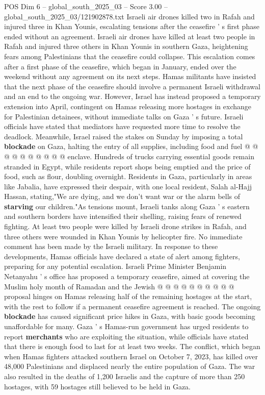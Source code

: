 \begin{textsample}{POS Dim 6 – global\_south\_2025\_03 – Score 3.00 – global\_south\_2025\_03/121902878.txt}  \label{ex:f6_pos_226}
Israeli air drones killed two in Rafah and injured three in Khan Younis, escalating tensions after the ceasefire ' s first phase ended without an agreement.
Israeli air drones have killed at least two people in Rafah and injured three others in Khan Younis in southern Gaza, heightening fears among Palestinians that the ceasefire could collapse.
This escalation comes after a first phase of the ceasefire, which began in January, ended over the weekend without any agreement on its next steps.
Hamas militants have insisted that the next phase of the ceasefire should involve a permanent Israeli withdrawal and an end to the ongoing war.
However, Israel has instead proposed a temporary extension into April, contingent on Hamas releasing more hostages in exchange for Palestinian detainees, without immediate talks on Gaza ' s future.
Israeli officials have stated that mediators have requested more time to resolve the deadlock.
Meanwhile, Israel raised the stakes on Sunday by imposing a total \textbf{blockade} on Gaza, halting the entry of all supplies, including food and fuel @ @ @ @ @ @ @ @ @ @ enclave.
Hundreds of trucks carrying essential goods remain stranded in Egypt, while residents report shops being emptied and the price of food, such as flour, doubling overnight.
Residents in Gaza, particularly in areas like Jabalia, have expressed their despair, with one local resident, Salah al-Hajj Hassan, stating,"We are dying, and we don't want war or the alarm bells of \textbf{starving} our children."As tensions mount, Israeli tanks along Gaza ' s eastern and southern borders have intensified their shelling, raising fears of renewed fighting.
At least two people were killed by Israeli drone strikes in Rafah, and three others were wounded in Khan Younis by helicopter fire.
No immediate comment has been made by the Israeli military.
In response to these developments, Hamas officials have declared a state of alert among fighters, preparing for any potential escalation.
Israeli Prime Minister Benjamin Netanyahu ' s office has proposed a temporary ceasefire, aimed at covering the Muslim holy month of Ramadan and the Jewish @ @ @ @ @ @ @ @ @ @ proposal hinges on Hamas releasing half of the remaining hostages at the start, with the rest to follow if a permanent ceasefire agreement is reached.
The ongoing \textbf{blockade} has caused significant price hikes in Gaza, with basic goods becoming unaffordable for many.
Gaza ' s Hamas-run government has urged residents to report \textbf{merchants} who are exploiting the situation, while officials have stated that there is enough food to last for at least two weeks.
The conflict, which began when Hamas fighters attacked southern Israel on October 7, 2023, has killed over 48,000 Palestinians and displaced nearly the entire population of Gaza.
The war also resulted in the deaths of 1,200 Israelis and the capture of more than 250 hostages, with 59 hostages still believed to be held in Gaza.

\end{textsample}
